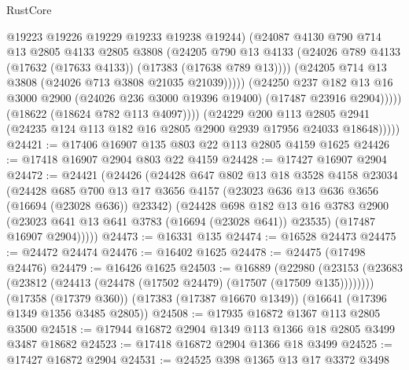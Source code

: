 \begin{lexlean}{RustCore}
\begin{coremodule}
                          @19223
                          @19226
                          @19229
                          @19233
                          @19238
                          @19244)
                        (@24087
                          @4130
                          @790
                          @714
                          @13
                          @2805
                          @4133
                          @2805
                          @3808
                          (@24205
                            @790
                            @13
                            @4133
                            (@24026 @789 @4133 (@17632 (@17633 @4133)) (@17383 (@17638 @789 @13))))
                          (@24205 @714 @13 @3808 (@24026 @713 @3808 @21035 @21039)))))
                    (@24250
                      @237
                      @182
                      @13
                      @16
                      @3000
                      @2900
                      (@24026 @236 @3000 @19396 @19400)
                      (@17487 @23916 @2904)))))
              (@18622 (@18624 @782 @113 @4097))))
          (@24229
            @200
            @113
            @2805
            @2941
            (@24235 @124 @113 @182 @16 @2805 @2900 @2939 @17956 @24033 @18648)))))
@24421 := @17406 @16907 @135 @803 @22 @113 @2805 @4159 @1625
@24426 := @17418 @16907 @2904 @803 @22 @4159
@24428 := @17427 @16907 @2904
@24472 := @24421
    (@24426
      (@24428
        @647
        @802
        @13
        @18
        @3528
        @4158
        @23034
        (@24428
          @685
          @700
          @13
          @17
          @3656
          @4157
          (@23023 @636 @13 @636 @3656 (@16694 (@23028 @636)) @23342)
          (@24428
            @698
            @182
            @13
            @16
            @3783
            @2900
            (@23023 @641 @13 @641 @3783 (@16694 (@23028 @641)) @23535)
            (@17487 @16907 @2904)))))
@24473 := @16331 @135
@24474 := @16528 @24473
@24475 := @24472 @24474
@24476 := @16402 @1625
@24478 := @24475 (@17498 @24476)
@24479 := @16426 @1625
@24503 := @16889
    (@22980 (@23153 (@23683 (@23812 (@24413 (@24478 (@17502 @24479) (@17507 (@17509 @135))))))))
    (@17358 (@17379 @360))
    (@17383 (@17387 @16670 @1349))
    (@16641 (@17396 @1349 @1356 @3485 @2805))
@24508 := @17935 @16872 @1367 @113 @2805 @3500
@24518 := @17944 @16872 @2904 @1349 @113 @1366 @18 @2805 @3499 @3487 @18682
@24523 := @17418 @16872 @2904 @1366 @18 @3499
@24525 := @17427 @16872 @2904
@24531 := @24525 @398 @1365 @13 @17 @3372 @3498

\end{coremodule}
\end{lexlean}
